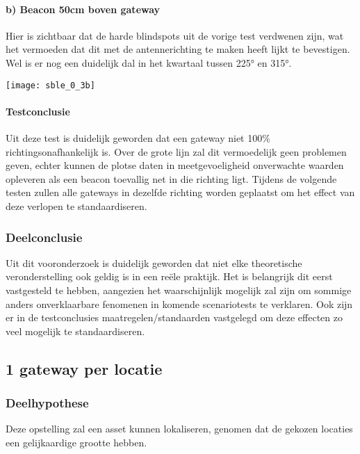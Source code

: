 \paragraph{b) Beacon 50cm boven gateway}

\begin{minipage}{0.55\textwidth}
Hier is zichtbaar dat de harde blindspots uit de vorige test verdwenen zijn, wat het vermoeden dat dit met de antennerichting te maken heeft lijkt te bevestigen. Wel is er nog een duidelijk dal in het kwartaal tussen 225° en 315°.
\end{minipage}
\hfill
\begin{minipage}{0.42\textwidth}
	\texttt{[image: sble\_0\_3b]}
\end{minipage}

\paragraph{Testconclusie}
Uit deze test is duidelijk geworden dat een gateway niet 100\% richtingsonafhankelijk is. Over de grote lijn zal dit vermoedelijk geen problemen geven, echter kunnen de plotse daten in meetgevoeligheid onverwachte waarden opleveren als een beacon toevallig net in die richting ligt.
Tijdens de volgende testen zullen alle gateways in dezelfde richting worden geplaatst om het effect van deze verlopen te standaardiseren. 

\subsubsection{Deelconclusie}
Uit dit vooronderzoek is duidelijk geworden dat niet elke theoretische veronderstelling ook geldig is in een reële praktijk. Het is belangrijk dit eerst vastgesteld te hebben, aangezien het waarschijnlijk mogelijk zal zijn om sommige anders onverklaarbare fenomenen in komende scenariotests te verklaren. Ook zijn er in de testconclusies maatregelen/standaarden vastgelegd om deze effecten zo veel mogelijk te standaardiseren.

\subsection{1 gateway per locatie}
\subsubsection{Deelhypothese}
Deze opstelling zal een asset kunnen lokaliseren, genomen dat de gekozen locaties een gelijkaardige grootte hebben.

